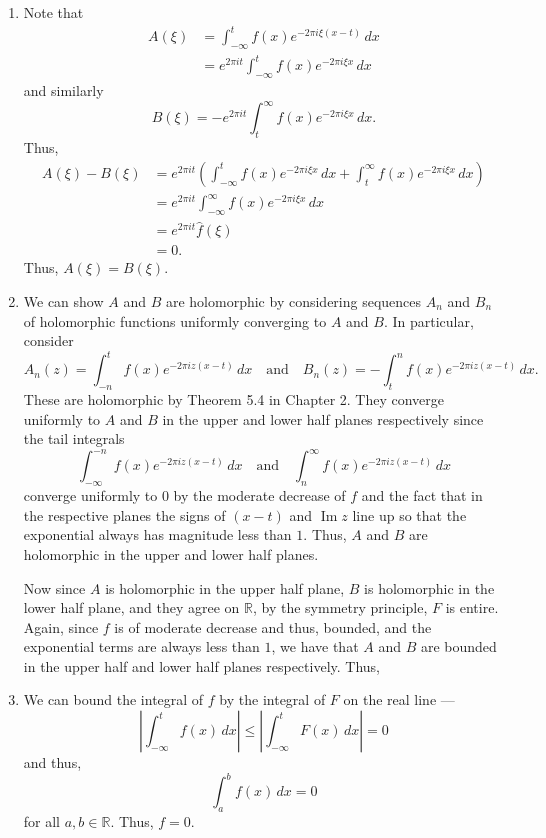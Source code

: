 \documentclass[12 pt, letterpaper]{hmcpset}
\begin{document}
\begin{solution}
	\begin{enumerate}
		\item Note that
			\[
				\begin{split}
					A(\xi) & = \int_{-\infty}^{t} f(x) e^{- 2 \pi i \xi (x - t)} \, dx \\
					       & = e^{2 \pi i t} \int_{-\infty}^{t} f(x) e^{-2 \pi i \xi x} \, dx 
				\end{split}
			\]
			and similarly
			\[
				B(\xi) = - e^{2 \pi i t} \int_{t}^{\infty} f(x) e^{- 2 \pi i \xi x} \, dx.
			\]
			Thus,
			\[
				\begin{split}
					A(\xi) - B(\xi) & = e^{2 \pi i t} \left ( \int_{-\infty}^{t} f(x) e^{- 2 \pi i \xi x} \, dx + \int_{t}^{\infty} f(x) e^{- 2 \pi i \xi x} \, dx  \right ) \\
							& = e^{2 \pi i t} \int_{-\infty}^{\infty} f(x) e^{- 2 \pi i \xi x} \, dx \\
							& = e^{2 \pi i t} \hat{f}(\xi) \\
							& = 0.
				\end{split}
			\]
			Thus, $A(\xi) = B(\xi)$.
		\item We can show $A$ and $B$ are holomorphic by considering sequences $A_{n}$ and $B_{n}$ of holomorphic functions uniformly converging to $A$ and $B$. In particular, consider
			\[
				A_{n}(z) = \int_{-n}^{t} f(x) e^{-2 \pi i z(x - t)} \, dx \quad \text{and} \quad B_{n}(z) = - \int_{t}^{n} f(x) e^{-2 \pi i z(x - t)} \, dx.
			\]
			These are holomorphic by Theorem 5.4 in Chapter 2. They converge uniformly to $A$ and $B$ in the upper and lower half planes respectively since the tail integrals
			\[
				\int_{-\infty}^{-n} f(x) e^{- 2 \pi i z(x - t)}  \, dx \quad \text{and}  \quad \int_{n}^{\infty} f(x) e^{- 2 \pi i z(x - t)} \, dx 
			\]
			converge uniformly to $0$ by the moderate decrease of $f$ and the fact that in the respective planes the signs of $(x - t)$ and $\operatorname{Im} z$ line up so that the exponential always has magnitude less than $1$. Thus, $A$ and $B$ are holomorphic in the upper and lower half planes.

			Now since $A$ is holomorphic in the upper half plane, $B$ is holomorphic in the lower half plane, and they agree on $\mathbb{R}$, by the symmetry principle, $F$ is entire. Again, since $f$ is of moderate decrease and thus, bounded, and the exponential terms are always less than $1$, we have that $A$ and $B$ are bounded in the upper half and lower half planes respectively. Thus, 
		\item We can bound the integral of $f$ by the integral of $F$ on the real line ---
			\[
				\left \lvert \int_{-\infty}^{t} f(x) \, dx  \right \rvert \le \left \lvert \int_{-\infty}^{t} F(x) \, dx  \right \rvert = 0
			\]
			and thus,
			\[
				\int_{a}^{b} f(x) \, dx = 0
			\]
			for all $a, b \in \mathbb{R}$. Thus, $f = 0$.
	\end{enumerate}
\end{solution}
\end{document}
